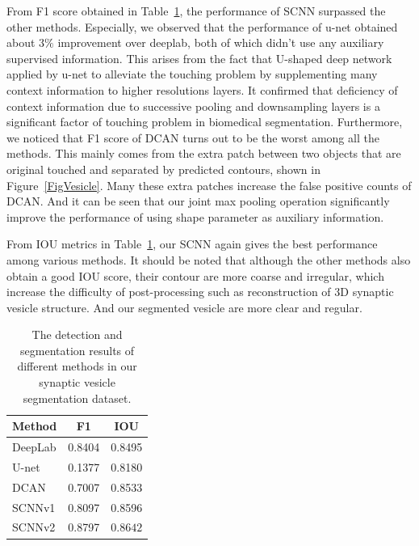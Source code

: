 From F1 score obtained in Table~\ref{tab:vesicle}, the performance of SCNN surpassed the other methods.
Especially, we observed that the performance of u-net obtained about $3\%$ improvement over deeplab, both of which didn't use any auxiliary supervised information.
This arises from the fact that U-shaped deep network applied by u-net to alleviate the touching problem by supplementing many context information to higher resolutions layers.
It confirmed that deficiency of context information due to successive pooling and downsampling layers is a significant factor of touching problem in biomedical segmentation.
Furthermore, we noticed that F1 score of DCAN turns out to be the worst among all the methods.
This mainly comes from the extra patch between two objects that are original touched and separated by predicted contours, shown in Figure~\ref{FigVesicle}.
Many these extra patches increase the false positive counts of DCAN.
And it can be seen that our joint max pooling operation significantly improve the performance of using shape parameter as auxiliary information.

From IOU metrics in Table~\ref{tab:vesicle}, our SCNN again gives the best performance among various methods.
It should be noted that although the other methods also obtain a good IOU score, their contour are more coarse and irregular, which increase the difficulty of post-processing such as reconstruction of 3D synaptic vesicle structure.
And our segmented vesicle are more clear and regular. 


\begin{table}
\begin{center}
\begin{tabular}{lcc}
\hline
Method & F1 & IOU \\
\hline
DeepLab & 0.8404 & 0.8495 \\
U-net & 0.1377 & 0.8180 \\
DCAN & 0.7007 & 0.8533 \\
SCNNv1 & 0.8097 & 0.8596 \\
SCNNv2 & 0.8797 & $\mathbf{0.8642}$\\
\hline
\end{tabular}
\end{center}
\caption{The detection and segmentation results of different methods in our synaptic vesicle segmentation dataset.}
\label{tab:vesicle}
\end{table}





